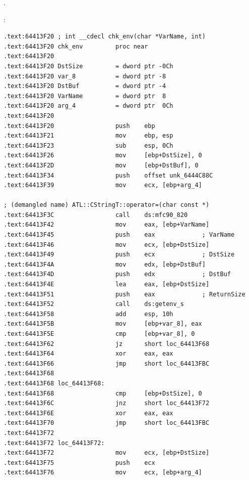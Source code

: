 .

%
:

\begin{lstlisting}
.text:64413F20 ; int __cdecl chk_env(char *VarName, int)
.text:64413F20 chk_env         proc near
.text:64413F20
.text:64413F20 DstSize         = dword ptr -0Ch
.text:64413F20 var_8           = dword ptr -8
.text:64413F20 DstBuf          = dword ptr -4
.text:64413F20 VarName         = dword ptr  8
.text:64413F20 arg_4           = dword ptr  0Ch
.text:64413F20
.text:64413F20                 push    ebp
.text:64413F21                 mov     ebp, esp
.text:64413F23                 sub     esp, 0Ch
.text:64413F26                 mov     [ebp+DstSize], 0
.text:64413F2D                 mov     [ebp+DstBuf], 0
.text:64413F34                 push    offset unk_6444C88C
.text:64413F39                 mov     ecx, [ebp+arg_4]

; (demangled name) ATL::CStringT::operator=(char const *)
.text:64413F3C                 call    ds:mfc90_820 
.text:64413F42                 mov     eax, [ebp+VarName]
.text:64413F45                 push    eax             ; VarName
.text:64413F46                 mov     ecx, [ebp+DstSize]
.text:64413F49                 push    ecx             ; DstSize
.text:64413F4A                 mov     edx, [ebp+DstBuf]
.text:64413F4D                 push    edx             ; DstBuf
.text:64413F4E                 lea     eax, [ebp+DstSize]
.text:64413F51                 push    eax             ; ReturnSize
.text:64413F52                 call    ds:getenv_s
.text:64413F58                 add     esp, 10h
.text:64413F5B                 mov     [ebp+var_8], eax
.text:64413F5E                 cmp     [ebp+var_8], 0
.text:64413F62                 jz      short loc_64413F68
.text:64413F64                 xor     eax, eax
.text:64413F66                 jmp     short loc_64413FBC
.text:64413F68
.text:64413F68 loc_64413F68:
.text:64413F68                 cmp     [ebp+DstSize], 0
.text:64413F6C                 jnz     short loc_64413F72
.text:64413F6E                 xor     eax, eax
.text:64413F70                 jmp     short loc_64413FBC
.text:64413F72
.text:64413F72 loc_64413F72:
.text:64413F72                 mov     ecx, [ebp+DstSize]
.text:64413F75                 push    ecx
.text:64413F76                 mov     ecx, [ebp+arg_4]


\end{lstlisting}
